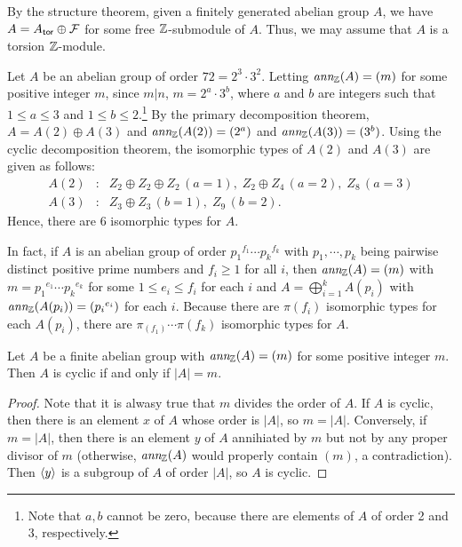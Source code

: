 By the structure theorem, given a finitely generated abelian group $A$, we have $A=A_{\textsf{tor}}\oplus{\mathcal{F}}$ for some free ${\mathbb{Z}}$-submodule of $A$.
Thus, we may assume that $A$ is a torsion ${\mathbb{Z}}$-module.
\begin{exmp}
    Let $A$ be an abelian group of order $72=2^3\cdot 3^2$.
    Letting $\textit{ann}_{\mathbb{Z}}(A)=(m)$ for some positive integer $m$, since $m|n$, $m=2^a\cdot 3^b$, where $a$ and $b$ are integers such that $1\leq a\leq 3$ and $1\leq b\leq 2$.\footnote{Note that $a, b$ cannot be zero, because there are elements of $A$ of order 2 and 3, respectively.}
    By the primary decomposition theorem, $A=A(2)\oplus A(3)$ and $\textit{ann}_{\mathbb{Z}}(A(2))=(2^a)$ and $\textit{ann}_{\mathbb{Z}}(A(3))=(3^b)$.
    Using the cyclic decomposition theorem, the isomorphic types of $A(2)$ and $A(3)$ are given as follows:
    \begin{eqnarray*}
        A(2) & : &
            Z_2 \oplus Z_2 \oplus Z_2\,(a=1),\;
            Z_2 \oplus Z_4\,(a=2),\;
            Z_8\,(a=3)\\
        A(3) & : &
            Z_3 \oplus Z_3\,(b=1),\;
            Z_9\,(b=2).
    \end{eqnarray*}
    Hence, there are 6 isomorphic types for $A$.

    In fact, if $A$ is an abelian group of order ${p_1}^{f_1}\cdots{p_k}^{f_k}$ with $p_1, \cdots, p_k$ being pairwise distinct positive prime numbers and $f_i\geq 1$ for all $i$, then $\textit{ann}_{\mathbb{Z}}(A)=(m)$ with $m={p_1}^{e_1}\cdots{p_k}^{e_k}$ for some $1\leq e_i\leq f_i$ for each $i$ and $A=\bigoplus_{i=1}^k A(p_i)$ with $\textit{ann}_{\mathbb{Z}}(A(p_i))=({p_i}^{e_i})$ for each $i$.
    Because there are $\pi(f_i)$ isomorphic types for each $A(p_i)$, there are $\pi_(f_1)\cdots\pi(f_k)$ isomorphic types for $A$.
\end{exmp}

\begin{prop}
    Let $A$ be a finite abelian group with $\textit{ann}_{\mathbb{Z}}(A)=(m)$ for some positive integer $m$.
    Then $A$ is cyclic if and only if $|A|=m$.
\end{prop}
\begin{proof}
    Note that it is alwasy true that $m$ divides the order of $A$.
    If $A$ is cyclic, then there is an element $x$ of $A$ whose order is $|A|$, so $m=|A|$.
    Conversely, if $m=|A|$, then there is an element $y$ of $A$ annihiated by $m$ but not by any proper divisor of $m$ (otherwise, $\textit{ann}_{\mathbb{Z}}(A)$ would properly contain $(m)$, a contradiction).
    Then ${\left\langle{y}\right\rangle}$ is a subgroup of $A$ of order $|A|$, so $A$ is cyclic.
\end{proof}

